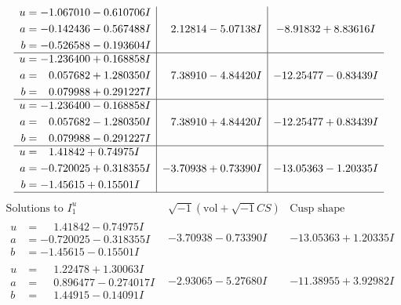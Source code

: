 \documentclass[1p]{elsarticle_modified}
\theoremstyle{definition}
\newcommand{\I}{\sqrt{-1}}
\begin{document}
$$\begin{array}{c|c|c}
\begin{aligned}
u &= -1.067010 - 0.610706 I \\
a &= -0.142436 - 0.567488 I \\
b &= -0.526588 - 0.193604 I\end{aligned}
 & \phantom{-}2.12814 - 5.07138 I & -8.91832 + 8.83616 I \\ \hline\begin{aligned}
u &= -1.236400 + 0.168858 I \\
a &= \phantom{-}0.057682 + 1.280350 I \\
b &= \phantom{-}0.079988 + 0.291227 I\end{aligned}
 & \phantom{-}7.38910 - 4.84420 I & -12.25477 - 0.83439 I \\ \hline\begin{aligned}
u &= -1.236400 - 0.168858 I \\
a &= \phantom{-}0.057682 - 1.280350 I \\
b &= \phantom{-}0.079988 - 0.291227 I\end{aligned}
 & \phantom{-}7.38910 + 4.84420 I & -12.25477 + 0.83439 I \\ \hline\begin{aligned}
u &= \phantom{-}1.41842 + 0.74975 I \\
a &= -0.720025 + 0.318355 I \\
b &= -1.45615 + 0.15501 I\end{aligned}
 & -3.70938 + 0.73390 I & -13.05363 - 1.20335 I\\
 \hline 
 \end{array}$$\newpage$$\begin{array}{c|c|c}  
\text{Solutions to }I^u_{1}& \I (\text{vol} + \sqrt{-1}CS) & \text{Cusp shape}\\
 \hline 
\begin{aligned}
u &= \phantom{-}1.41842 - 0.74975 I \\
a &= -0.720025 - 0.318355 I \\
b &= -1.45615 - 0.15501 I\end{aligned}
 & -3.70938 - 0.73390 I & -13.05363 + 1.20335 I \\ \hline\begin{aligned}
u &= \phantom{-}1.22478 + 1.30063 I \\
a &= \phantom{-}0.896477 - 0.274017 I \\
b &= \phantom{-}1.44915 - 0.14091 I\end{aligned}
 & -2.93065 - 5.27680 I & -11.38955 + 3.92982 I \\ \hline\begin{aligned}

\end{aligned}
\end{array}$$
\end{document}

